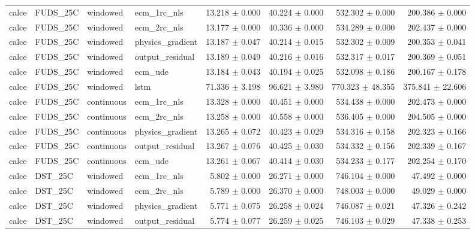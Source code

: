 \begin{longtable}{llllrrrr}
calce & FUDS\_25C & windowed & ecm\_1rc\_nls & 13.218 $\pm$ 0.000 & 40.224 $\pm$ 0.000 & 532.302 $\pm$ 0.000 & 200.386 $\pm$ 0.000 \\
calce & FUDS\_25C & windowed & ecm\_2rc\_nls & 13.177 $\pm$ 0.000 & 40.336 $\pm$ 0.000 & 534.289 $\pm$ 0.000 & 202.437 $\pm$ 0.000 \\
calce & FUDS\_25C & windowed & physics\_gradient & 13.187 $\pm$ 0.047 & 40.214 $\pm$ 0.015 & 532.302 $\pm$ 0.009 & 200.353 $\pm$ 0.041 \\
calce & FUDS\_25C & windowed & output\_residual & 13.189 $\pm$ 0.049 & 40.216 $\pm$ 0.016 & 532.317 $\pm$ 0.017 & 200.369 $\pm$ 0.051 \\
calce & FUDS\_25C & windowed & ecm\_ude & 13.184 $\pm$ 0.043 & 40.194 $\pm$ 0.025 & 532.098 $\pm$ 0.186 & 200.167 $\pm$ 0.178 \\
calce & FUDS\_25C & windowed & lstm & 71.336 $\pm$ 3.198 & 96.621 $\pm$ 3.980 & 770.323 $\pm$ 48.355 & 375.841 $\pm$ 22.606 \\
calce & FUDS\_25C & continuous & ecm\_1rc\_nls & 13.328 $\pm$ 0.000 & 40.451 $\pm$ 0.000 & 534.438 $\pm$ 0.000 & 202.473 $\pm$ 0.000 \\
calce & FUDS\_25C & continuous & ecm\_2rc\_nls & 13.258 $\pm$ 0.000 & 40.558 $\pm$ 0.000 & 536.405 $\pm$ 0.000 & 204.505 $\pm$ 0.000 \\
calce & FUDS\_25C & continuous & physics\_gradient & 13.265 $\pm$ 0.072 & 40.423 $\pm$ 0.029 & 534.316 $\pm$ 0.158 & 202.323 $\pm$ 0.166 \\
calce & FUDS\_25C & continuous & output\_residual & 13.267 $\pm$ 0.076 & 40.425 $\pm$ 0.030 & 534.332 $\pm$ 0.156 & 202.339 $\pm$ 0.167 \\
calce & FUDS\_25C & continuous & ecm\_ude & 13.261 $\pm$ 0.067 & 40.414 $\pm$ 0.030 & 534.233 $\pm$ 0.177 & 202.254 $\pm$ 0.170 \\
calce & DST\_25C & windowed & ecm\_1rc\_nls & 5.802 $\pm$ 0.000 & 26.271 $\pm$ 0.000 & 746.104 $\pm$ 0.000 & 47.492 $\pm$ 0.000 \\
calce & DST\_25C & windowed & ecm\_2rc\_nls & 5.789 $\pm$ 0.000 & 26.370 $\pm$ 0.000 & 748.003 $\pm$ 0.000 & 49.029 $\pm$ 0.000 \\
calce & DST\_25C & windowed & physics\_gradient & 5.771 $\pm$ 0.075 & 26.258 $\pm$ 0.024 & 746.087 $\pm$ 0.021 & 47.326 $\pm$ 0.242 \\
calce & DST\_25C & windowed & output\_residual & 5.774 $\pm$ 0.077 & 26.259 $\pm$ 0.025 & 746.103 $\pm$ 0.029 & 47.338 $\pm$ 0.253 \\

\end{longtable}
